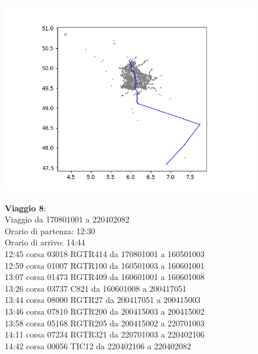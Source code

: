 \documentclass{article}
\begin{document}
\begin{figure}[H]
	\begin{minipage}{0.55\linewidth}
		\centering
		\hspace*{-6cm}\includegraphics[width=1.0\linewidth, valign=t]{figures/Figure_1}
	\end{minipage}
	\hspace*{-4cm}\begin{minipage}{0.7\linewidth}
		\textbf{Viaggio 8}:\\
		Viaggio da 170801001 a 220402082\\
		Orario di partenza: 12:30\\
		Orario di arrivo: 14:44\\
		12:45 corsa 03018 RGTR414 da 170801001 a 160501003\\
		12:59 corsa 01007 RGTR100 da 160501003 a 160601001\\
		13:07 corsa 01473 RGTR409 da 160601001 a 160601008\\
		13:26 corsa 03737 C821 da 160601008 a 200417051\\
		13:44 corsa 08000 RGTR27 da 200417051 a 200415003\\
		13:46 corsa 07810 RGTR200 da 200415003 a 200415002\\
		13:58 corsa 05168 RGTR205 da 200415002 a 220701003\\
		14:11 corsa 07234 RGTR321 da 220701003 a 220402106\\
		14:42 corsa 00056 TIC12 da 220402106 a 220402082
		
			\end{minipage}
\end{figure}
\end{document}

